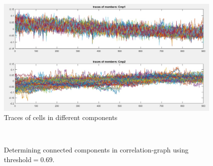 \documentclass[10pt]{article}
\begin{document}
\begin{figure}[h!]
\centering
\includegraphics[scale=0.5]{component_traces.jpg}
\caption{Traces of cells in different components}
\label{fig:Traces_components}
\end{figure}


\begin{figure}[h!]
\centering
{}\\
\caption{Determining connected components in correlation-graph using threshold$ = 0.69$.}
\label{fig:cwhist_allTraces}
\end{figure}
\end{document}
